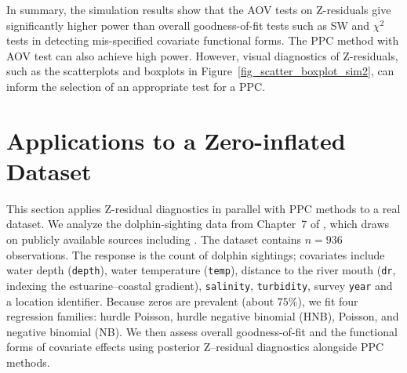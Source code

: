 In summary, the simulation results show that the AOV tests on Z-residuals give significantly higher power than overall goodness-of-fit tests such as SW and $\chi^2$ tests in detecting mis-specified covariate functional forms. The PPC method with AOV test can also achieve high power. However, visual diagnostics of Z-residuals, such as the scatterplots and boxplots in Figure~\ref{fig_scatter_boxplot_sim2}, can inform the selection of an appropriate test for a PPC. 


\section{Applications to a Zero-inflated Dataset}\label{real_data}

This section applies Z-residual diagnostics in parallel with PPC methods to a real dataset. We analyze the dolphin-sighting data from Chapter~7 of  \citet{TheWorldofZeroInflatedModels}, which draws on publicly available sources including \citet{JacksonRickettsJustine2020HmoI}. The dataset contains $n=936$ observations. The response is the count of dolphin sightings;  covariates include water depth (\texttt{depth}), water temperature (\texttt{temp}), distance to the river mouth (\texttt{dr}, indexing the estuarine–coastal gradient), \texttt{salinity}, \texttt{turbidity}, survey \texttt{year} and a location identifier. Because zeros are prevalent (about $75\%$), we fit four regression families: hurdle Poisson, hurdle negative binomial (HNB), Poisson, and negative binomial (NB). We then assess overall goodness-of-fit and the functional forms of covariate effects using posterior Z–residual diagnostics alongside PPC methods.


